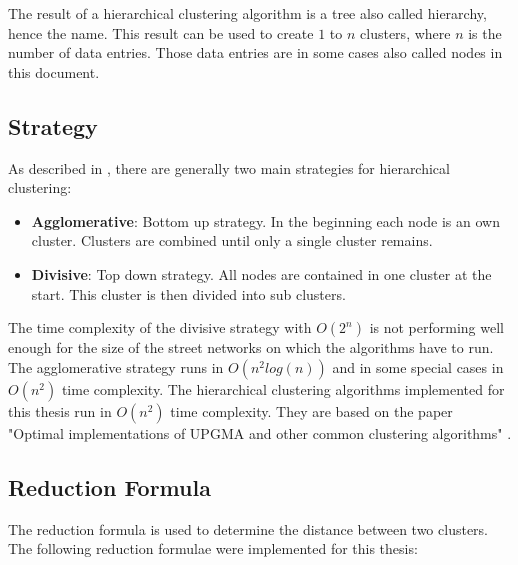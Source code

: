 The result of a hierarchical clustering algorithm is a tree also called hierarchy, hence the name. This result can be used to create $1$ to $n$ clusters, where $n$ is the number of data entries. Those data entries are in some cases also called nodes in this document.

\subsection{Strategy}
As described in \cite{clustering:2005}, there are generally two main strategies for hierarchical clustering:

\begin{itemize}
    \item \textbf{Agglomerative}: Bottom up strategy. In the beginning each node is an own cluster. Clusters are combined until only a single cluster remains.
    \item \textbf{Divisive}: Top down strategy. All nodes are contained in one cluster at the start. This cluster is then divided into sub clusters.
\end{itemize}

The time complexity of the divisive strategy with $O(2^n)$ is not performing well enough for the size of the street networks on which the algorithms have to run. The agglomerative strategy runs in $O(n^2 log(n))$ and in some special cases in $O(n^2)$ time complexity. The hierarchical clustering algorithms implemented for this thesis run in $O(n^2)$ time complexity. They are based on the paper "Optimal implementations of UPGMA and other common clustering algorithms" \cite{clustering:2007}.

\subsection{Reduction Formula}
The reduction formula is used to determine the distance between two clusters.
The following reduction formulae were implemented for this thesis:


